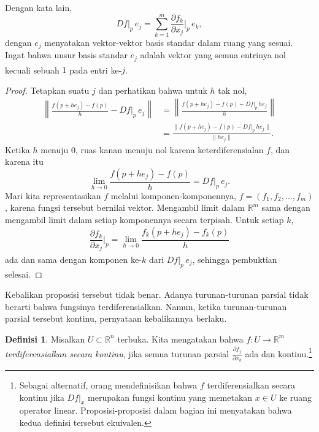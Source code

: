 \documentclass[12pt,openany]{book}
\newcommand{\snorm}[1]{\lVert {#1} \rVert}
\newcommand{\norm}[1]{\left\lVert {#1} \right\rVert}
\newcommand{\R}{{\mathbb{R}}}
\newcommand{\myindex}[1]{#1\index{#1}}
\theoremstyle{plain}
\theoremstyle{remark}
\theoremstyle{definition}
\newtheorem{defn}[thm]{Definisi}
\theoremstyle{exercise}
\theoremstyle{example}
\begin{document}
Dengan kata lain,
\begin{equation*}
Df|_p \, e_j =
\sum_{k=1}^m
\frac{\partial f_k}{\partial x_j}\Big|_p \,e_k ,
\end{equation*}
dengan $e_j$ menyatakan vektor-vektor basis standar dalam ruang yang sesuai.
Ingat bahwa unsur basis standar $e_j$ adalah vektor yang semua entrinya nol
kecuali sebuah $1$ pada entri ke-$j$\textsuperscript{}.

\begin{proof}
Tetapkan suatu $j$ dan perhatikan bahwa untuk $h$ tak nol,
\begin{equation*}
\begin{split}
\norm{\frac{f(p+h e_j)-f(p)}{h} - Df|_p \, e_j} & = 
\norm{\frac{f(p+h e_j)-f(p) - Df|_p \, h e_j}{h}} \\
& =
\frac{\snorm{f(p+h e_j)-f(p) - Df|_p \, h e_j}}{\snorm{h e_j}} .
\end{split}
\end{equation*}
Ketika $h$ menuju $0$, ruas kanan menuju nol karena
keterdiferensialan $f$, dan karena itu
\begin{equation*}
\lim_{h \to 0}
\frac{f(p+h e_j)-f(p)}{h} = Df|_p \, e_j  .
\end{equation*}
Mari kita representasikan $f$ melalui komponen-komponennya,
$f = (f_1,f_2,\ldots,f_m)$, karena fungsi tersebut bernilai vektor.
Mengambil limit dalam $\R^m$
sama dengan mengambil limit dalam setiap komponennya secara terpisah.
Untuk setiap $k$,
\begin{equation*}
\frac{\partial f_k}{\partial x_j} \Big|_p
=
\lim_{h \to 0}
\frac{f_k(p+h e_j)-f_k(p)}{h}
\end{equation*}
ada dan
sama dengan komponen ke-$k$\textsuperscript{} dari $Df|_p\, e_j$, sehingga pembuktian selesai.
\end{proof}

Kebalikan proposisi tersebut tidak benar.  Adanya turunan-turunan parsial
tidak berarti bahwa fungsinya terdiferensialkan.
Namun, ketika turunan-turunan parsial tersebut kontinu,
pernyataan kebalikannya berlaku.


\begin{defn}
Misalkan $U \subset \R^n$ terbuka.
Kita mengatakan bahwa $f \colon U \to \R^m$
\emph{\myindex{terdiferensialkan secara kontinu}},
jika semua turunan parsial
$\frac{\partial f_j}{\partial x_k}$ ada dan kontinu.\footnote{%
Sebagai alternatif, orang mendefinisikan bahwa $f$ terdiferensialkan secara kontinu
jika $Df|_x$ merupakan fungsi kontinu yang memetakan $x \in U$ ke ruang operator
linear.  Proposisi-proposisi dalam bagian ini menyatakan bahwa kedua definisi tersebut ekuivalen.}
\end{defn}
\end{document}
